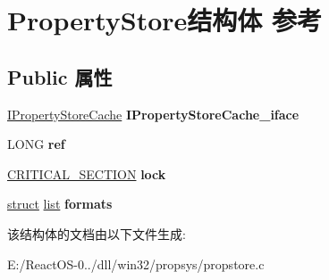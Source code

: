 \hypertarget{struct_property_store}{}\section{Property\+Store结构体 参考}
\label{struct_property_store}
\subsection*{Public 属性}
\begin{DoxyCompactItemize}
\item 
\mbox{\label{struct_property_store_a86ccd6960e5d152bde900e3501ca6ba1}} 
\hyperlink{interface_i_property_store_cache}{I\+Property\+Store\+Cache} {\bfseries I\+Property\+Store\+Cache\+\_\+iface}
\item 
\mbox{\label{struct_property_store_ae1c53b6c59c96c9803f1f918c4b4e5d4}} 
L\+O\+NG {\bfseries ref}
\item 
\mbox{\label{struct_property_store_a72df5802fa6a3c96284d56c75769b36c}} 
\hyperlink{struct___c_r_i_t_i_c_a_l___s_e_c_t_i_o_n}{C\+R\+I\+T\+I\+C\+A\+L\+\_\+\+S\+E\+C\+T\+I\+ON} {\bfseries lock}
\item 
\mbox{\label{struct_property_store_a7ec67f9165cbeeb42c9b6f73502209ae}} 
\hyperlink{interfacestruct}{struct} \hyperlink{classlist}{list} {\bfseries formats}
\end{DoxyCompactItemize}


该结构体的文档由以下文件生成\+:\begin{DoxyCompactItemize}
\item 
E\+:/\+React\+O\+S-\/0../dll/win32/propsys/propstore.\+c\end{DoxyCompactItemize}
